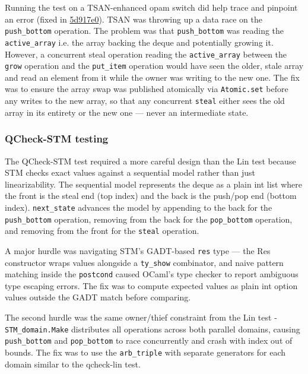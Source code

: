 \documentclass[11pt,a4paper]{article}
\begin{document}
Running the test on a TSAN-enhanced opam switch did help trace and pinpoint
an error (fixed in
\href{https://github.com/alinab/fork-cs6868_s26/commit/5d917e0d987c3c1a6a507697c65432e02636c1ce}{5d917e0}).
TSAN was throwing up a data race on the \texttt{push\_bottom} operation. The problem
was that \texttt{push\_bottom} was reading the \texttt{active\_array}
i.e. the array backing the deque and potentially growing it. However, a
concurrent steal operation reading the \texttt{active\_array} between the
\texttt{grow} operation and the \texttt{put\_item} operation would have seen
the older, stale array and read an element from it while the owner
was writing to the new one. The fix was to ensure the array swap was published
atomically via \texttt{Atomic.set} before any writes to the new array, so that any
concurrent \texttt{steal} either sees the old array in its entirety or the
new one — never an intermediate state.

\subsubsection{QCheck-STM testing}

The QCheck-STM test required a more careful design than the Lin test because
STM checks exact values against a sequential model rather than just
linearizability. The sequential model represents the deque as a plain int list
where the front is the steal end (top index) and the back is the push/pop end
(bottom index). \texttt{next\_state} advances the model by appending to the
back for the \texttt{push\_bottom} operation, removing from the back for the
\texttt{pop\_bottom} operation, and removing from the front for the
\texttt{steal} operation.

A major hurdle was navigating STM's GADT-based \texttt{res} type — the Res
constructor wraps values alongside a \texttt{ty\_show} combinator, and naive pattern
matching inside the \texttt{postcond} caused OCaml's type checker to report ambiguous
type escaping errors. The fix was to compute expected values as plain int option
values outside the GADT match before comparing.

The second hurdle was the same owner/thief constraint from the Lin test -
\texttt{STM\_domain.Make} distributes all operations across both parallel domains,
causing \texttt{push\_bottom} and \texttt{pop\_bottom} to race concurrently
and crash with index out of bounds. The fix was to use the \texttt{arb\_triple}
with separate generators for each domain similar to the qcheck-lin test.
\end{document}
